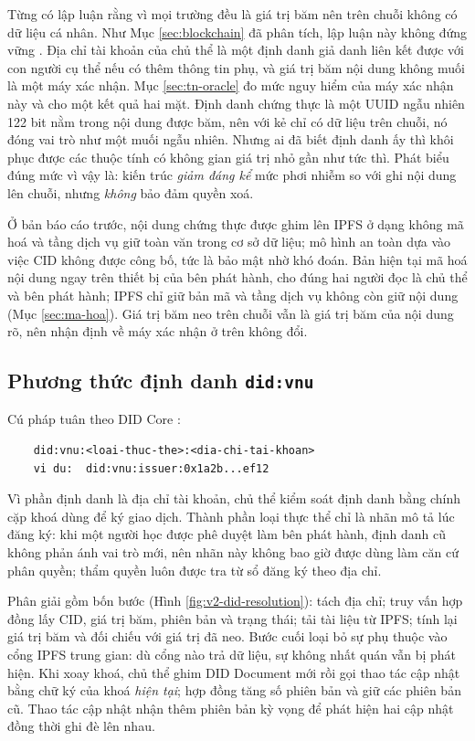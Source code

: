 Từng có lập luận rằng vì mọi trường đều là giá trị băm nên trên chuỗi không có dữ liệu cá nhân. Như Mục \ref{sec:blockchain} đã phân tích, lập luận này không đứng vững \cite{EDPB2025}. Địa chỉ tài khoản của chủ thể là một định danh giả danh liên kết được với con người cụ thể nếu có thêm thông tin phụ, và giá trị băm nội dung không muối là một máy xác nhận. Mục \ref{sec:tn-oracle} đo mức nguy hiểm của máy xác nhận này và cho một kết quả hai mặt. Định danh chứng thực là một UUID ngẫu nhiên 122 bit nằm trong nội dung được băm, nên với kẻ chỉ có dữ liệu trên chuỗi, nó đóng vai trò như một muối ngẫu nhiên. Nhưng ai đã biết định danh ấy thì khôi phục được các thuộc tính có không gian giá trị nhỏ gần như tức thì. Phát biểu đúng mức vì vậy là: kiến trúc \emph{giảm đáng kể} mức phơi nhiễm so với ghi nội dung lên chuỗi, nhưng \emph{không} bảo đảm quyền xoá.

Ở bản báo cáo trước, nội dung chứng thực được ghim lên IPFS ở dạng không mã hoá và tầng dịch vụ giữ toàn văn trong cơ sở dữ liệu; mô hình an toàn dựa vào việc CID không được công bố, tức là bảo mật nhờ khó đoán. Bản hiện tại mã hoá nội dung ngay trên thiết bị của bên phát hành, cho đúng hai người đọc là chủ thể và bên phát hành; IPFS chỉ giữ bản mã và tầng dịch vụ không còn giữ nội dung (Mục \ref{sec:ma-hoa}). Giá trị băm neo trên chuỗi vẫn là giá trị băm của nội dung rõ, nên nhận định về máy xác nhận ở trên không đổi.

\subsection{Phương thức định danh \texttt{did:vnu}}

Cú pháp tuân theo DID Core \cite{W3C_DIDCore2022}:

\begin{lstlisting}
    did:vnu:<loai-thuc-the>:<dia-chi-tai-khoan>
    vi du:  did:vnu:issuer:0x1a2b...ef12
\end{lstlisting}

 Vì phần định danh là địa chỉ tài khoản, chủ thể kiểm soát định danh bằng chính cặp khoá dùng để ký giao dịch. Thành phần loại thực thể chỉ là nhãn mô tả lúc đăng ký: khi một người học được phê duyệt làm bên phát hành, định danh cũ không phản ánh vai trò mới, nên nhãn này không bao giờ được dùng làm căn cứ phân quyền; thẩm quyền luôn được tra từ sổ đăng ký theo địa chỉ.

Phân giải gồm bốn bước (Hình \ref{fig:v2-did-resolution}): tách địa chỉ; truy vấn hợp đồng lấy CID, giá trị băm, phiên bản và trạng thái; tải tài liệu từ IPFS; tính lại giá trị băm và đối chiếu với giá trị đã neo. Bước cuối loại bỏ sự phụ thuộc vào cổng IPFS trung gian: dù cổng nào trả dữ liệu, sự không nhất quán vẫn bị phát hiện. Khi xoay khoá, chủ thể ghim DID Document mới rồi gọi thao tác cập nhật bằng chữ ký của khoá \emph{hiện tại}; hợp đồng tăng số phiên bản và giữ các phiên bản cũ. Thao tác cập nhật nhận thêm phiên bản kỳ vọng để phát hiện hai cập nhật đồng thời ghi đè lên nhau.

